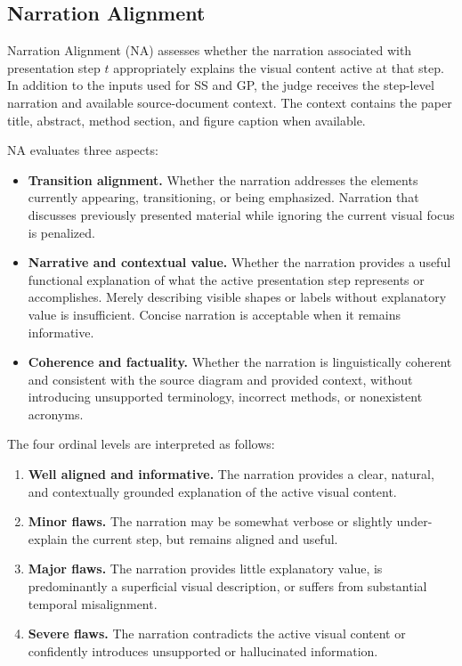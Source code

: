 \documentclass{article} %
\begin{document}
\subsection{Narration Alignment}
\label{sec:supp_na}

Narration Alignment (NA) assesses whether the narration associated with
presentation step $t$ appropriately explains the visual content active at that
step. In addition to the inputs used for SS and GP, the judge receives the
step-level narration and available source-document context. The context
contains the paper title, abstract, method section, and figure caption when
available.

NA evaluates three aspects:

\begin{itemize}
    \item \textbf{Transition alignment.}
    Whether the narration addresses the elements currently appearing,
    transitioning, or being emphasized. Narration that discusses previously
    presented material while ignoring the current visual focus is penalized.

    \item \textbf{Narrative and contextual value.}
    Whether the narration provides a useful functional explanation of what the
    active presentation step represents or accomplishes. Merely describing
    visible shapes or labels without explanatory value is insufficient.
    Concise narration is acceptable when it remains informative.

    \item \textbf{Coherence and factuality.}
    Whether the narration is linguistically coherent and consistent with the
    source diagram and provided context, without introducing unsupported
    terminology, incorrect methods, or nonexistent acronyms.
\end{itemize}

The four ordinal levels are interpreted as follows:

\begin{enumerate}
    \item[4.] \textbf{Well aligned and informative.}
    The narration provides a clear, natural, and contextually grounded
    explanation of the active visual content.

    \item[3.] \textbf{Minor flaws.}
    The narration may be somewhat verbose or slightly under-explain the
    current step, but remains aligned and useful.

    \item[2.] \textbf{Major flaws.}
    The narration provides little explanatory value, is predominantly a
    superficial visual description, or suffers from substantial temporal
    misalignment.

    \item[1.] \textbf{Severe flaws.}
    The narration contradicts the active visual content or confidently
    introduces unsupported or hallucinated information.
\end{enumerate}
\end{document}
